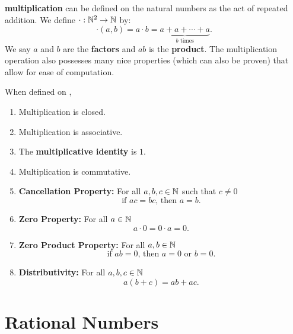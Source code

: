          \textbf{multiplication} can be defined on the natural numbers as the act of repeated addition. We define $\cdot:\mathbb{N}^2 \to \mathbb{N}$ by:
        $$\cdot(a,b) = a\cdot b = \underbrace{a + a + \cdots + a}_{b \text{ times}}.$$ We say $a$ and $b$ are the \textbf{factors} and $ab$ is the \textbf{product}. The multiplication operation also possesses many nice properties (which can also be proven) that allow for ease of computation.

        \begin{theorem}\label{thm:PoM}
            When defined on \N,
            \begin{enumerate}
                \item Multiplication is closed.
                \item Multiplication is associative.
                \item The \textbf{multiplicative identity} is $1$.
                \item Multiplication is commutative.
                \item \textbf{Cancellation Property:} For all $a,b,c \in \mathbb{N}$ such that $c \neq 0$ $$\text{if } ac=bc \text{, then } a=b.$$
                \item \textbf{Zero Property:} For all $a \in \mathbb{N}$ $$a\cdot 0 = 0 \cdot a = 0.$$
                \item \textbf{Zero Product Property:} For all $a,b \in \mathbb{N}$ $$\text{if } ab=0 \text{, then } a=0 \text{ or } b=0.$$
                \item \textbf{Distributivity:} For all $a,b,c \in \mathbb{N}$ $$a(b+c) = ab + ac.$$
            \end{enumerate}
        \end{theorem}


    \section{Rational Numbers}\label{sec:rats}